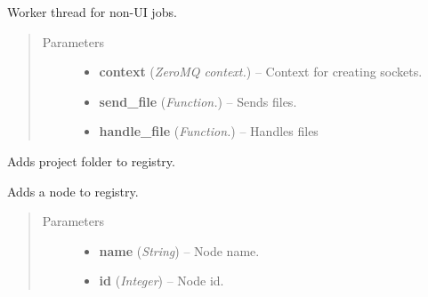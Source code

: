 \documentclass[letterpaper,10pt,english]{sphinxmanual}
\begin{document}

\begin{fulllineitems}
\label{api:wos.WORKER_THREAD}
Worker thread for non-UI jobs.
\begin{quote}\begin{description}
\item[{Parameters}] \leavevmode\begin{itemize}
\item {} 
\textbf{context} (\emph{ZeroMQ context.}) -- Context for creating sockets.

\item {} 
\textbf{send\_file} (\emph{Function.}) -- Sends files.

\item {} 
\textbf{handle\_file} (\emph{Function.}) -- Handles files

\end{itemize}

\end{description}\end{quote}

\begin{fulllineitems}
\label{api:wos.WORKER_THREAD.AddProjectReg}
Adds project folder to registry.

\end{fulllineitems}


\begin{fulllineitems}
\label{api:wos.WORKER_THREAD.AddRegEntry}
Adds a node to registry.
\begin{quote}\begin{description}
\item[{Parameters}] \leavevmode\begin{itemize}
\item {} 
\textbf{name} (\emph{String}) -- Node name.

\item {} 
\textbf{id} (\emph{Integer}) -- Node id.

\end{itemize}

\end{description}\end{quote}


\end{fulllineitems}
\end{fulllineitems}
\end{document}
